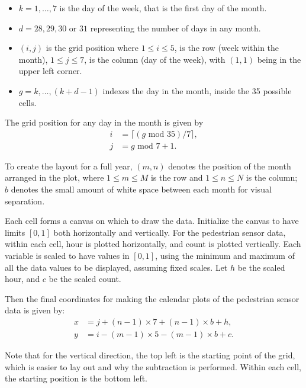 \documentclass[12pt]{article}
\providecommand{\tightlist}{%
  \setlength{\itemsep}{0pt}\setlength{\parskip}{0pt}}
\begin{document}
\begin{itemize}
\tightlist
\item
  \(k = 1, \dots , 7\) is the day of the week, that is the first day of the month.
\item
  \(d = 28, 29, 30\) or \(31\) representing the number of days in any month.
\item
  \((i, j)\) is the grid position where \(1 \le i \le 5\), is the row (week within the month), \(1 \le j \le 7\), is the column (day of the week), with \((1, 1)\) being in the upper left corner.
\item
  \(g = k, \dots,(k + d - 1)\) indexes the day in the month, inside the 35 possible cells.
\end{itemize}

The grid position for any day in the month is given by
\begin{equation}
  \begin{aligned}
  i &= \lceil (g \text{ mod } 35) / 7\rceil, \\
  j &= g \text{ mod } 7 + 1.
  \end{aligned}
  \label{eq:grid}
\end{equation}

To create the layout for a full year, \((m, n)\) denotes the position of the month arranged in the plot, where \(1 \le m \le M\) is the row and \(1 \le n \le N\) is the column; \(b\) denotes the small amount of white space between each month for visual separation.

Each cell forms a canvas on which to draw the data. Initialize the canvas to have limits \([0, 1]\) both horizontally and vertically. For the pedestrian sensor data, within each cell, hour is plotted horizontally, and count is plotted vertically. Each variable is scaled to have values in \([0, 1]\), using the minimum and maximum of all the data values to be displayed, assuming fixed scales. Let \(h\) be the scaled hour, and \(c\) be the scaled count.

Then the final coordinates for making the calendar plots of the pedestrian sensor data is given by:
\begin{equation}
  \begin{aligned}
  x &= j + (n - 1) \times 7 + (n - 1) \times b + h, \\
  y &= i - (m - 1) \times 5 - (m - 1) \times b + c.
  \end{aligned}
  \label{eq:final}
\end{equation}

Note that for the vertical direction, the top left is the starting point of the grid, which is easier to lay out and why the subtraction is performed. Within each cell, the starting position is the bottom left.
\end{document}
